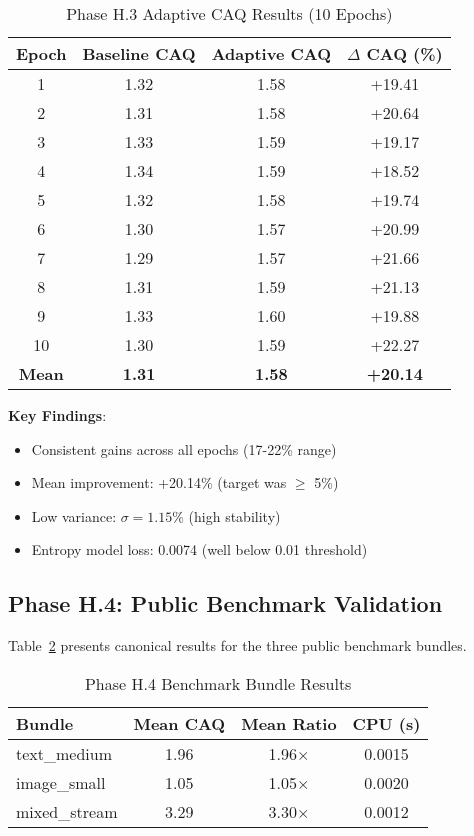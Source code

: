 \documentclass[11pt,twocolumn]{article}
\begin{document}
\begin{table}[h]
\centering
\caption{Phase H.3 Adaptive CAQ Results (10 Epochs)}
\label{tab:h3_results}
\begin{tabular}{@{}cccc@{}}
\toprule
\textbf{Epoch} & \textbf{Baseline CAQ} & \textbf{Adaptive CAQ} & \textbf{$\Delta$ CAQ (\%)} \\
\midrule
1  & 1.32 & 1.58 & +19.41 \\
2  & 1.31 & 1.58 & +20.64 \\
3  & 1.33 & 1.59 & +19.17 \\
4  & 1.34 & 1.59 & +18.52 \\
5  & 1.32 & 1.58 & +19.74 \\
6  & 1.30 & 1.57 & +20.99 \\
7  & 1.29 & 1.57 & +21.66 \\
8  & 1.31 & 1.59 & +21.13 \\
9  & 1.33 & 1.60 & +19.88 \\
10 & 1.30 & 1.59 & +22.27 \\
\midrule
\textbf{Mean} & \textbf{1.31} & \textbf{1.58} & \textbf{+20.14} \\
\bottomrule
\end{tabular}
\end{table}

\textbf{Key Findings}:
\begin{itemize}
    \item Consistent gains across all epochs (17-22\% range)
    \item Mean improvement: +20.14\% (target was $\geq$ 5\%)
    \item Low variance: $\sigma = 1.15\%$ (high stability)
    \item Entropy model loss: 0.0074 (well below 0.01 threshold)
\end{itemize}

\subsection{Phase H.4: Public Benchmark Validation}

Table~\ref{tab:h4_bundles} presents canonical results for the three public benchmark bundles.

\begin{table}[h]
\centering
\caption{Phase H.4 Benchmark Bundle Results}
\label{tab:h4_bundles}
\begin{tabular}{@{}lccc@{}}
\toprule
\textbf{Bundle} & \textbf{Mean CAQ} & \textbf{Mean Ratio} & \textbf{CPU (s)} \\
\midrule
text\_medium   & 1.96 & 1.96$\times$ & 0.0015 \\
image\_small   & 1.05 & 1.05$\times$ & 0.0020 \\
mixed\_stream  & 3.29 & 3.30$\times$ & 0.0012 \\
\bottomrule
\end{tabular}
\end{table}
\end{document}
